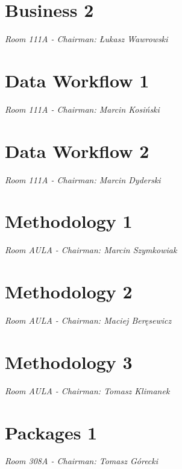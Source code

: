 \documentclass[11pt,twoside,b5paper]{book}
\begin{document}
\chapter{Business 2}{\LARGE \textit{Room 111A - Chairman: Łukasz Wawrowski}}






\chapter{Data Workflow 1}{\LARGE \textit{Room 111A - Chairman: Marcin Kosiński}}





\chapter{Data Workflow 2}{\LARGE \textit{Room 111A - Chairman: Marcin Dyderski}}





\chapter{Methodology 1}{\LARGE \textit{Room AULA - Chairman: Marcin Szymkowiak}}




\chapter{Methodology 2}{\LARGE \textit{Room AULA - Chairman: Maciej Beręsewicz}}






\chapter{Methodology 3}{\LARGE \textit{Room AULA - Chairman: Tomasz Klimanek}}





\chapter{Packages 1}{\LARGE \textit{Room 308A - Chairman: Tomasz Górecki}}




% 

\end{document}
